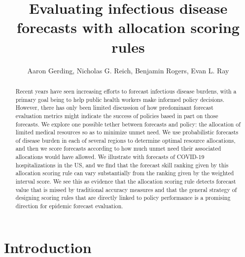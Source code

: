 \documentclass{article}\usepackage[]{graphicx}\usepackage[]{xcolor}
\title{Evaluating infectious disease forecasts with allocation scoring rules}
\author{Aaron Gerding, Nicholas G. Reich, Benjamin Rogers, Evan L. Ray}
\begin{document}
\newcommand{\del}[2]{\frac{\partial {#1} }{\partial {#2}} }
\newcommand{\dby}[2]{\frac{d {#1} }{d {#2}} }
\newcommand{\sbar}{\overline{s}}
\newtheorem{proposition}{Proposition}

\theoremstyle{remark}
\newtheorem*{remark}{Remark}

\maketitle







\begin{abstract}

Recent years have seen increasing efforts to forecast infectious disease burdens, with a primary goal being to help public health workers make informed policy decisions. However, there has only been limited discussion of how predominant forecast evaluation metrics might indicate the success of policies based in part on those forecasts. We explore one possible tether between forecasts and policy: the allocation of limited medical resources so as to minimize unmet need. We use probabilistic forecasts of disease burden in each of several regions to determine optimal resource allocations, and then we score forecasts according to how much unmet need their associated allocations would have allowed. We illustrate with forecasts of COVID-19 hospitalizations in the US, and we find that the forecast skill ranking given by this allocation scoring rule can vary substantially from the ranking given by the weighted interval score. We see this as evidence that the allocation scoring rule detects forecast value that is missed by traditional accuracy measures and that the general strategy of designing scoring rules that are directly linked to policy performance is a promising direction for epidemic forecast evaluation.

\end{abstract}

\section{Introduction}
\end{document}
